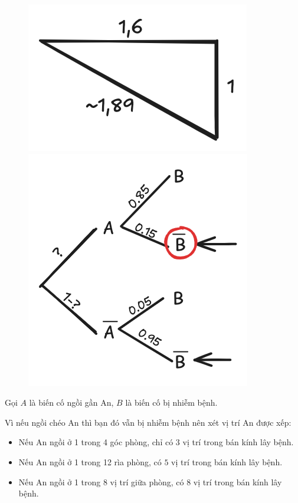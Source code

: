 \documentclass[twoside,final]{hcmut-report}
\begin{document}
\begin{figure}
    \centering
    \includegraphics[width=0.8\linewidth]{images/Nghệ An 2025 - Đợt 3/NgheAn25-3.png}
    \includegraphics[width=1.2\linewidth]{images/Nghệ An 2025 - Đợt 3/NgheAn25-4.png}
\end{figure}

Gọi $A$ là biến cố ngồi gần An, $B$ là biến cố bị nhiễm bệnh.\par
Vì nếu ngồi chéo An thì bạn đó vẫn bị nhiễm bệnh nên xét vị trí An được xếp:
\begin{itemize}[itemsep=0pt, topsep=0pt, parsep=0pt,label=-]
    \item Nếu An ngồi ở 1 trong 4 góc phòng, chỉ có $3$ vị trí trong bán kính lây bệnh.
    \item Nếu An ngồi ở 1 trong 12 rìa phòng, có $5$ vị trí trong bán kính lây bệnh.
    \item Nếu An ngồi ở 1 trong 8 vị trí giữa phòng, có $8$ vị trí trong bán kính lây bệnh.
\end{itemize}
\end{document}
